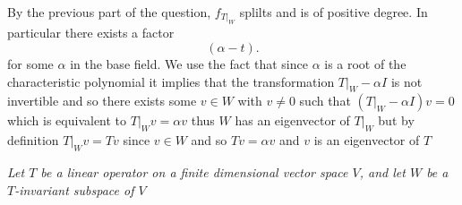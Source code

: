 \documentclass{article}
\begin{document}
\begin{enumerate}
                By the previous part of the question, $f_{T|_W}$ splilts and is of positive degree. In particular there exists a factor
                \[
                    (\alpha-t)
                .\] 
                for some $\alpha$ in the base field. We use the fact that since $\alpha$ is a root of the characteristic polynomial
                it implies that the transformation  $T|_{W} - \alpha I$ is not invertible and so there exists some $v \in W$ with $v \ne 0$ such that
                $(T|_W - \alpha I)v = 0$ which is equivalent to $T|_W v = \alpha v$ thus $W$ has an eigenvector of $T|_W$ but
                by definition  $T|_W v = Tv$ since $v \in W$ and so  $Tv = \alpha v$ and $v$ is an eigenvector of $T$
    \end{enumerate}
    \emph{
    Let $T$ be a linear operator on a finite dimensional vector space $V$, and let $W$ be a $T$-invariant subspace of $V$}
\end{document}
